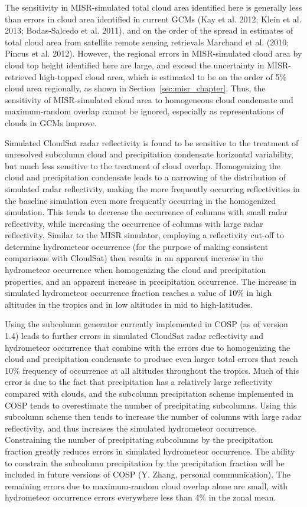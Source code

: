 The sensitivity in MISR-simulated total cloud area identified here is
generally less than errors in cloud area identified in current GCMs (Kay
et al. 2012; Klein et al. 2013; Bodas-Salcedo et al. 2011), and on the
order of the spread in estimates of total cloud area from satellite
remote sensing retrievals Marchand et al. (2010; Pincus et al. 2012).
However, the regional errors in MISR-simulated cloud area by cloud top
height identified here are large, and exceed the uncertainty in
MISR-retrieved high-topped cloud area, which is estimated to be on the
order of 5\% cloud area regionally, as shown in
Section~\ref{sec:misr_chapter}. Thus, the sensitivity of MISR-simulated
cloud area to homogeneous cloud condensate and maximum-random overlap
cannot be ignored, especially as representations of clouds in GCMs
improve.

Simulated CloudSat radar reflectivity is found to be sensitive to the
treatment of unresolved subcolumn cloud and precipitation condensate
horizontal variability, but much less sensitive to the treatment of
cloud overlap. Homogenizing the cloud and precipitation condensate leads
to a narrowing of the distribution of simulated radar reflectivity,
making the more frequently occurring reflectivities in the baseline
simulation even more frequently occurring in the homogenized simulation.
This tends to decrease the occurrence of columns with small radar
reflectivity, while increasing the occurrence of columns with large
radar reflectivity. Similar to the MISR simulator, employing a
reflectivity cut-off to determine hydrometeor occurrence (for the
purpose of making consistent comparisons with CloudSat) then results in
an apparent increase in the hydrometeor occurrence when homogenizing the
cloud and precipitation properties, and an apparent increase in
precipitation occurrence. The increase in simulated hydrometeor
occurrence fraction reaches a value of 10\% in high altitudes in the
tropics and in low altitudes in mid to high-latitudes.

Using the subcolumn generator currently implemented in COSP (as of
version 1.4) leads to further errors in simulated CloudSat radar
reflectivity and hydrometeor occurrence that combine with the errors due
to homogenizing the cloud and precipitation condensate to produce even
larger total errors that reach 10\% frequency of occurrence at all
altitudes throughout the tropics. Much of this error is due to the fact
that precipitation has a relatively large reflectivity compared with
clouds, and the subcolumn precipitation scheme implemented in COSP tends
to overestimate the number of precipitating subcolumns. Using this
subcolumn scheme then tends to increase the number of columns with large
radar reflectivity, and thus increases the simulated hydrometeor
occurrence. Constraining the number of precipitating subcolumns by the
precipitation fraction greatly reduces errors in simulated hydrometeor
occurrence. The ability to constrain the subcolumn precipitation by the
precipitation fraction will be included in future versions of COSP (Y.
Zhang, personal communication). The remaining errors due to
maximum-random cloud overlap alone are small, with hydrometeor
occurrence errors everywhere less than 4\% in the zonal mean.

